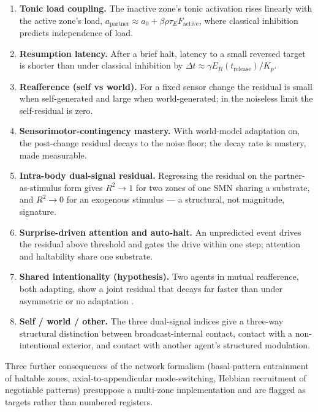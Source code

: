 \documentclass[utf8]{FrontiersinHarvard}
\begin{document}
\begin{enumerate}
\item \textbf{Tonic load coupling.} The inactive zone's tonic activation rises linearly with the active zone's load, $a_{\text{partner}}\approx a_0+\beta\rho\tau_E F_{\text{active}}$, where classical inhibition predicts independence of load.
\item \textbf{Resumption latency.} After a brief halt, latency to a small reversed target is shorter than under classical inhibition by $\Delta t\approx \gamma E_R(t_{\text{release}})/K_p$.
\item \textbf{Reafference (self vs world).} For a fixed sensor change the residual is small when self-generated and large when world-generated; in the noiseless limit the self-residual is zero.
\item \textbf{Sensorimotor-contingency mastery.} With world-model adaptation on, the post-change residual decays to the noise floor; the decay rate is mastery, made measurable.
\item \textbf{Intra-body dual-signal residual.} Regressing the residual on the partner-as-stimulus form gives $R^2\to1$ for two zones of one SMN sharing a substrate, and $R^2\to0$ for an exogenous stimulus --- a structural, not magnitude, signature.
\item \textbf{Surprise-driven attention and auto-halt.} An unpredicted event drives the residual above threshold and gates the drive within one step; attention and haltability share one substrate.
\item \textbf{Shared intentionality (hypothesis).} Two agents in mutual reafference, both adapting, show a joint residual that decays far faster than under asymmetric or no adaptation \citep{Tomasello2005Understanding}.
\item \textbf{Self / world / other.} The three dual-signal indices give a three-way structural distinction between broadcast-internal contact, contact with a non-intentional exterior, and contact with another agent's structured modulation.
\end{enumerate}

Three further consequences of the network formalism (basal-pattern entrainment of haltable zones, axial-to-appendicular mode-switching, Hebbian recruitment of negotiable patterns) presuppose a multi-zone implementation and are flagged as targets rather than numbered registers.

\end{document}
